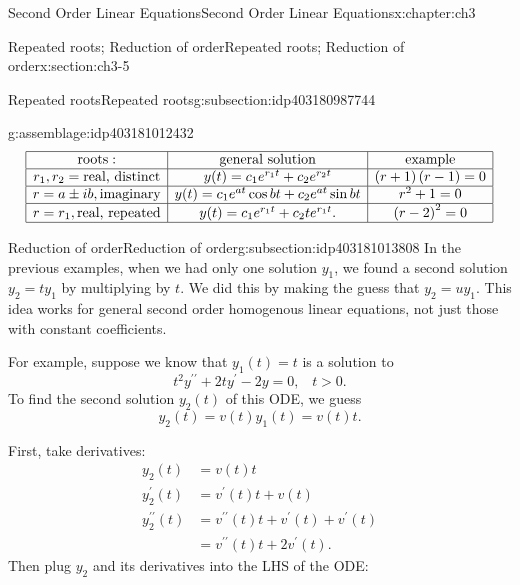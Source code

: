 \documentclass[oneside,10pt,]{book}
\numberwithin{equation}{section}
\numberwithin{equation}{section}
\newcommand{\amp}{&}
\begin{document}
\begin{chapterptx}{Second Order Linear Equations}{}{Second Order Linear Equations}{}{}{x:chapter:ch3}
\begin{sectionptx}{Repeated roots; Reduction of order}{}{Repeated roots; Reduction of order}{}{}{x:section:ch3-5}
\begin{subsectionptx}{Repeated roots}{}{Repeated roots}{}{}{g:subsection:idp403180987744}
\begin{assemblage}{}{g:assemblage:idp403181012432}
\begin{equation*}
\begin{array}{|c|c|c|}
\hline
\text{roots}: \amp \text{general solution} \amp \text{example}\\
\hline
r_{1},r_{2}= \text{real, distinct} \amp y(t)=c_{1}e^{r_{1}t}+c_{2}e^{r_{2}t} \amp \left(r+1\right)\left(r-1\right)=0 \\
\hline
r=a\pm ib,\text{imaginary} \amp y(t)=c_{1}e^{a t}\cos b t+c_{2}e^{a t}\sin b t \amp r^{2}+1=0\\
\hline
r=r_{1},\text{real, repeated} \amp y(t)=c_{1}e^{r_{1}t}+c_{2}te^{r_{1}t}. \amp \left(r-2\right)^{2}=0\\
\hline
\end{array}
\end{equation*}
%
\end{assemblage}
\end{subsectionptx}
%
%
\typeout{************************************************}
\typeout{************************************************}
%
\begin{subsectionptx}{Reduction of order}{}{Reduction of order}{}{}{g:subsection:idp403181013808}
In the previous examples, when we had only one solution \(y_{1}\), we found a second solution \(y_{2}=ty_{1}\) by multiplying by \(t\). We did this by making the guess that \(y_2 = u y_1\). This idea works for general second order homogenous linear equations, not just those with constant coefficients.%
\par
For example, suppose we know that \(y_{1}(t)=t\) is a solution to%
\begin{equation*}
t^{2}y^{\prime\prime}+2ty^{\prime}-2y=0,\,\,\,\,\,t>0.
\end{equation*}
To find the second solution \(y_{2}(t)\) of this ODE, we guess%
\begin{equation*}
y_{2}(t)=v(t)y_{1}(t)=v(t)t.
\end{equation*}
%
\par
First, take derivatives:%
\begin{align*}
y_{2}(t) \amp =v(t)t\\
y_{2}^{\prime}(t) \amp =v^{\prime}(t)t+v(t)\\
y_{2}^{\prime\prime}(t) \amp =v^{\prime\prime}(t)t+v^{\prime}(t)+v^{\prime}(t)\\
\amp =v^{\prime\prime}(t)t+2v^{\prime}(t).
\end{align*}
Then plug \(y_{2}\) and its derivatives into the LHS of the ODE:%
\begin{align*}

\end{align*}
\end{subsectionptx}
\end{sectionptx}
\end{chapterptx}
\end{document}
